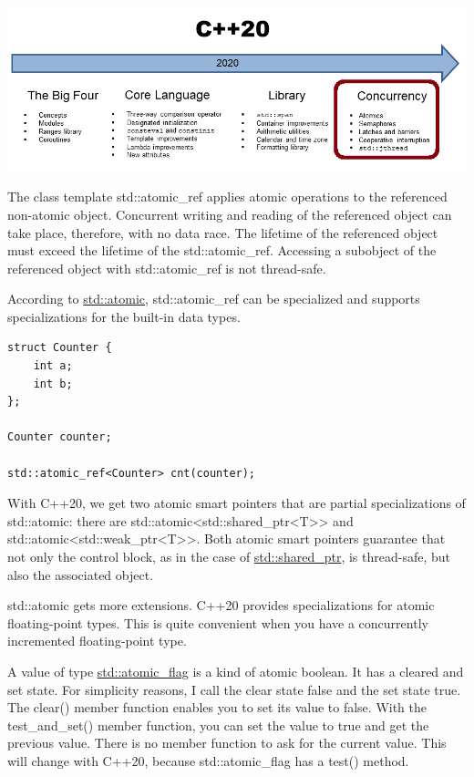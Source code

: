 
\begin{center}
\includegraphics[width=1.0\textwidth]{content/2/chapter3/images/7.png}\\
\end{center}


The class template std::atomic\_ref applies atomic operations to the referenced non-atomic object.
Concurrent writing and reading of the referenced object can take place, therefore, with no data race.
The lifetime of the referenced object must exceed the lifetime of the std::atomic\_ref. Accessing a subobject of the referenced object with std::atomic\_ref is not thread-safe.

According to \href{https://en.cppreference.com/w/cpp/atomic/atomic}{std::atomic}, std::atomic\_ref can be specialized and supports specializations for the built-in data types.

\begin{lstlisting}[style=styleCXX]
struct Counter {
	int a;
	int b;
};

Counter counter;

std::atomic_ref<Counter> cnt(counter);
\end{lstlisting}

With C++20, we get two atomic smart pointers that are partial specializations of std::atomic: there are std::atomic<std::shared\_ptr<T>> and std::atomic<std::weak\_ptr<T>>. Both atomic smart pointers guarantee that not only the control block, as in the case of \href{https://en.cppreference.com/w/cpp/memory/shared_ptr}{std::shared\_ptr}, is thread-safe, but also the associated object.

std::atomic gets more extensions. C++20 provides specializations for atomic floating-point types.
This is quite convenient when you have a concurrently incremented floating-point type.

A value of type \href{https://en.cppreference.com/w/cpp/atomic/atomic_flag}{std::atomic\_flag} is a kind of atomic boolean. It has a cleared and set state. For simplicity reasons, I call the clear state false and the set state true. The clear() member function enables you to set its value to false. With the test\_and\_set() member function, you can set the value to true and get the previous value. There is no member function to ask for the current value. This will change with C++20, because std::atomic\_flag has a test() method.

